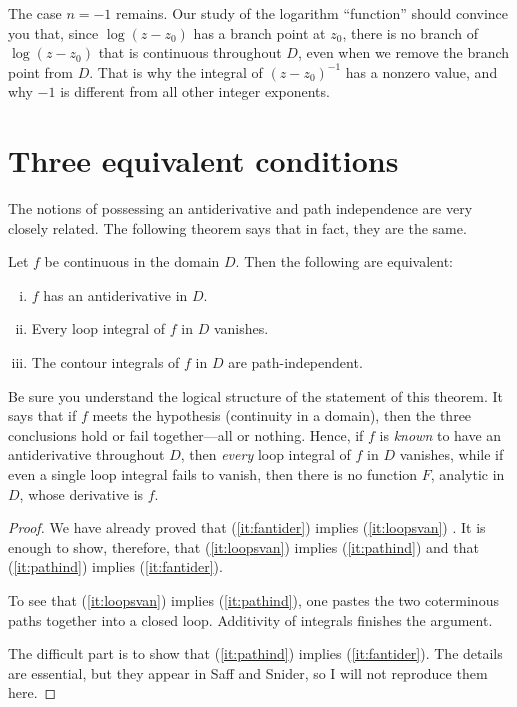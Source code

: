 \documentclass[twocolumn,12pt]{article}
\begin{document}
The case $n = -1$ remains. Our study of the logarithm ``function'' should convince you that, since $\log{(z - z_0)}$ has a branch point at $z_0$, there is no branch of $\log{(z-z_0)}$ that is continuous throughout $D$, even when we remove the branch point from $D$. That is why the integral of $(z - z_0)^{-1}$ has a nonzero value, and why $-1$ is different from all other integer exponents.

\section{Three equivalent conditions}
The notions of possessing an antiderivative and path independence are very closely related. The following theorem says that in fact, they are the same.
\begin{Theorem}
    Let $f$ be continuous in the domain $D$. Then the following are equivalent:
    \begin{enumerate}[(i)]
        \item $f$ has an antiderivative in $D$. \label{it:fantider}
        \item Every loop integral of $f$ in $D$ vanishes. \label{it:loopsvan}
        \item The contour integrals of $f$ in $D$ are path-independent. \label{it:pathind}
    \end{enumerate}
\end{Theorem}
Be sure you understand the logical structure of the statement of this theorem. It says that if $f$ meets the hypothesis (continuity in a domain), then the three conclusions hold or fail together---all or nothing. Hence, if $f$ is \emph{known} to have an antiderivative throughout $D$, then \emph{every} loop integral of $f$ in $D$ vanishes, while if even a single loop integral fails to vanish, then there is no function $F$, analytic in $D$, whose derivative is $f$.
\begin{proof}
    We have already proved that (\ref{it:fantider}) implies (\ref{it:loopsvan}) . It is enough to show, therefore, that (\ref{it:loopsvan}) implies (\ref{it:pathind}) and that (\ref{it:pathind}) implies (\ref{it:fantider}).

    To see that (\ref{it:loopsvan}) implies (\ref{it:pathind}), one pastes the two coterminous paths together into a closed loop. Additivity of integrals finishes the argument.

    The difficult part is to show that  (\ref{it:pathind}) implies (\ref{it:fantider}). The details are essential, but they appear in Saff and Snider, so I will not reproduce them here. 
\end{proof}
\end{document}

